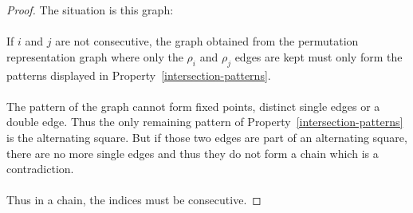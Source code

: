 \begin{proof}
  The situation is this graph:

  \begin{figure}[H]
    \begin{center}
      \caption{}
    \end{center}
  \end{figure}

  \paragraph{}
  If $i$ and $j$ are not consecutive, the graph obtained from the permutation representation graph where only the $\rho_i$ and $\rho_j$ edges are kept must only form the patterns displayed in Property~\ref{intersection-patterns}.

  \paragraph{}
  The pattern of the graph cannot form fixed points, distinct single edges or a double edge. Thus the only remaining pattern of Property~\ref{intersection-patterns} is the alternating square. But if those two edges are part of an alternating square, there are no more single edges and thus they do not form a chain which is a contradiction.

  \paragraph{}
  Thus in a chain, the indices must be consecutive.
\end{proof}

